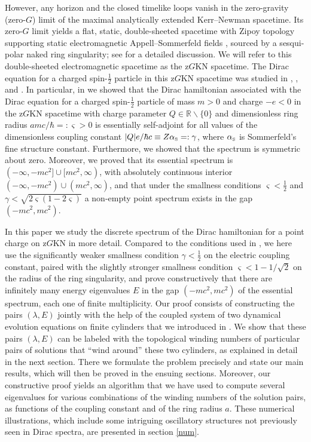 \documentclass[11 pt]{article}
\newcommand\bbR{{\mathbb R}}
\renewcommand\({\left(}
\renewcommand\){\right)}
\newcommand\<{\langle}
\renewcommand\>{\rangle}
\newcommand\8{\infty}
\newcommand{\alSo} {\alpha_{\mbox{\textrm{\tiny{S}}}}}
\begin{document}
   However, any horizon and the closed timelike loops vanish in the zero-gravity (zero-$G$) limit of the maximal analytically extended Kerr--Newman spacetime.
   Its zero-$G$ limit yields a flat, static, double-sheeted spacetime with Zipoy topology \cite{Zipoy} supporting static electromagnetic Appell--Sommerfeld fields 
 \cite{Appell}, \cite{Som97} sourced by a sesqui-polar naked ring singularity; see \cite{TZzGKN} for a detailed discussion.
   We will refer to this double-sheeted electromagnetic spacetime as the z$G$KN spacetime.
   The Dirac equation for a charged spin-$\frac12$ particle in this z$G$KN spacetime was studied in \cite{KTZzGKNDa}, \cite{KTZzGKNDb}, and 
\cite{KTZzGKNDc}.
   In particular, in \cite{KTZzGKNDa} we showed that the Dirac hamiltonian associated with the Dirac equation for a charged spin-$\frac12$ particle of 
mass $m>0$ and charge $-e<0$ in the z$G$KN spacetime with charge parameter $Q\in \bbR \backslash\{0\}$ and dimensionless ring radius 
$a mc/\hbar =:\varsigma>0$ is essentially self-adjoint for all values of the dimensionless coupling constant $|Q|e/\hbar c \equiv Z\alSo =: \gamma$, 
where $\alSo$ is Sommerfeld's fine structure constant. 
   Furthermore, we showed that the spectrum is symmetric about zero.
   Moreover, we proved that its essential spectrum is $(-\infty,-mc^2]\cup[mc^2,\infty)$, with absolutely continuous interior $(-\infty,-mc^2)\cup(mc^2,\infty)$,
and that under the smallness conditions $\varsigma <\frac12$ and $\gamma < \sqrt{2\varsigma(1-2\varsigma)}$ 
a non-empty point spectrum exists in the gap $(-mc^2,mc^2)$.
 
  In this paper we study the discrete spectrum of the Dirac hamiltonian for a point charge on z$G$KN in more detail. 
   Compared to the conditions used in \cite{KTZzGKNDa}, we here use
the significantly weaker smallness condition $\gamma <\frac12$ on the electric coupling constant, paired with the slightly stronger 
smallness condition $\varsigma < 1-1/\sqrt{2}$ on the radius of the ring singularity, and
prove constructively that there are infinitely many energy eigenvalues $E$  in the gap $(-mc^2,mc^2)$ of the essential spectrum, 
each one of finite multiplicity.
  Our proof consists of constructing the pairs $(\lambda,E)$ jointly
 with the help of the coupled system of two dynamical evolution equations on finite cylinders that we introduced in \cite{KTZzGKNDa}.
  We show that these pairs $(\lambda,E)$ can be labeled with the topological winding numbers of particular pairs of solutions that ``wind around''
these two cylinders, as explained in detail in the next section.
  There we formulate the problem precisely and state our main results, which will then be proved in the ensuing sections. 
  Moreover, our constructive proof yields an algorithm that we have used to compute several eigenvalues for 
various combinations of the winding numbers of the solution pairs, as functions of the coupling constant and of the ring radius $a$.
  These numerical illustrations, which include some intriguing oscillatory structures not previously seen in Dirac spectra, 
are presented in section \ref{num}.
\end{document}
